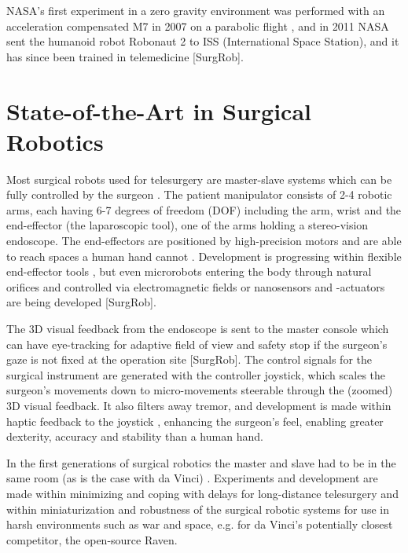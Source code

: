 NASA's first experiment in a zero gravity environment was performed with an acceleration compensated M7 in 2007 on a parabolic flight \citep[pp 29, 76, 85]{bib:surgical_book}, and in 2011 NASA sent the humanoid robot Robonaut 2 to ISS (International Space Station), and it has since been trained in telemedicine [SurgRob].







\section{State-of-the-Art in Surgical Robotics}
Most surgical robots used for telesurgery are master-slave systems which can be fully controlled by the surgeon \citep{bib:raven_debride}. The patient manipulator consists of 2-4 robotic arms, each having 6-7 degrees of freedom (DOF) \citep{bib:raven_debride} including the arm, wrist and the end-effector (the laparoscopic tool), one of the arms holding a stereo-vision endoscope. The end-effectors are positioned by high-precision motors and are able to reach spaces a human hand cannot \citep{bib:docatadist}.
Development is progressing within flexible end-effector tools \citep[p 74]{bib:surgical_book}, but even microrobots entering the body through natural orifices and controlled via electromagnetic fields or nanosensors and -actuators are being developed [SurgRob].

The 3D visual feedback from the endoscope is sent to the master console which can have eye-tracking for adaptive field of view and safety stop if the surgeon's gaze is not fixed at the operation site [SurgRob]. The control signals for the surgical instrument are generated with the controller joystick, which scales the surgeon's movements down to micro-movements \citep{bib:intuitive_monopoly} steerable through the (zoomed) 3D visual feedback. It also filters away tremor, and development is made within haptic feedback to the joystick \citep[p 89]{bib:surgical_book}, enhancing the surgeon's feel, enabling greater dexterity, accuracy and stability than a human hand.

In the first generations of surgical robotics the master and slave had to be in the same room (as is the case with da Vinci) \citep{bib:telesurg_history,bib:raven_debride,bib:surgical_book}. Experiments and development are made within minimizing and coping with delays for long-distance telesurgery and within miniaturization and robustness of the surgical robotic systems for use in harsh environments such as war and space, e.g. for da Vinci's potentially closest competitor, the open-source Raven.

